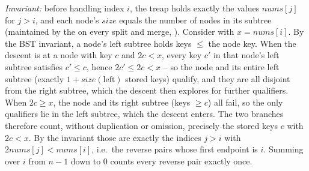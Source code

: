 \begin{proofbox}
\emph{Invariant:} before handling index $i$, the treap holds exactly the values $\mathit{nums}[j]$ for
$j>i$, and each node's $\mathit{size}$ equals the number of nodes in its subtree (maintained by the
 on every split and merge, ). Consider  with
$x=\mathit{nums}[i]$. By the BST invariant, a node's left subtree holds keys $\le$ the node key. When the
descent is at a node with key $c$ and $2c<x$, every key $c'$ in that node's left subtree satisfies
$c'\le c$, hence $2c'\le 2c<x$ -- so the node and its entire left subtree (exactly
$1+\mathit{size}(\text{left})$ stored keys) qualify, and they are all disjoint from the right subtree, which
the descent then explores for further qualifiers. When $2c\ge x$, the node and its right subtree (keys $\ge
c$) all fail, so the only qualifiers lie in the left subtree, which the descent enters. The two branches
therefore count, without duplication or omission, precisely the stored keys $c$ with $2c<x$. By the
invariant those are exactly the indices $j>i$ with $2\mathit{nums}[j]<\mathit{nums}[i]$, i.e.\ the reverse
pairs whose first endpoint is $i$. Summing over $i$ from $n-1$ down to $0$ counts every reverse pair exactly
once. \end{proofbox}

